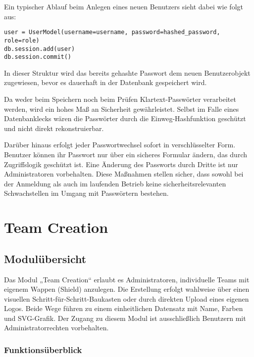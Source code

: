 \documentclass[12pt]{article}
\begin{document}
\noindent Ein typischer Ablauf beim Anlegen eines neuen Benutzers sieht dabei wie folgt aus:

\begin{verbatim}
user = UserModel(username=username, password=hashed_password, role=role)
db.session.add(user)
db.session.commit()
\end{verbatim}

\noindent In dieser Struktur wird das bereits gehashte Passwort dem neuen Benutzerobjekt zugewiesen, bevor es dauerhaft in der Datenbank gespeichert wird.

\noindent Da weder beim Speichern noch beim Prüfen Klartext-Passwörter verarbeitet werden, wird ein hohes Maß an Sicherheit gewährleistet. Selbst im Falle eines Datenbanklecks wären die Passwörter durch die Einweg-Hashfunktion geschützt und nicht direkt rekonstruierbar.

\noindent Darüber hinaus erfolgt jeder Passwortwechsel sofort in verschlüsselter Form. Benutzer können ihr Passwort nur über ein sicheres Formular ändern, das durch Zugriffslogik geschützt ist. Eine Änderung des Passworts durch Dritte ist nur Administratoren vorbehalten. Diese Maßnahmen stellen sicher, dass sowohl bei der Anmeldung als auch im laufenden Betrieb keine sicherheitsrelevanten Schwachstellen im Umgang mit Passwörtern bestehen.


\section{Team Creation}

\subsection{Modulübersicht}


Das Modul „Team Creation“ erlaubt es Administratoren, individuelle Teams mit eigenem Wappen (Shield) anzulegen. Die Erstellung erfolgt wahlweise über einen visuellen Schritt-für-Schritt-Baukasten oder durch direkten Upload eines eigenen Logos. Beide Wege führen zu einem einheitlichen Datensatz mit Name, Farben und SVG-Grafik. Der Zugang zu diesem Modul ist ausschließlich Benutzern mit Administratorrechten vorbehalten.

\newpage
\subsubsection*{Funktionsüberblick}
\end{document}

